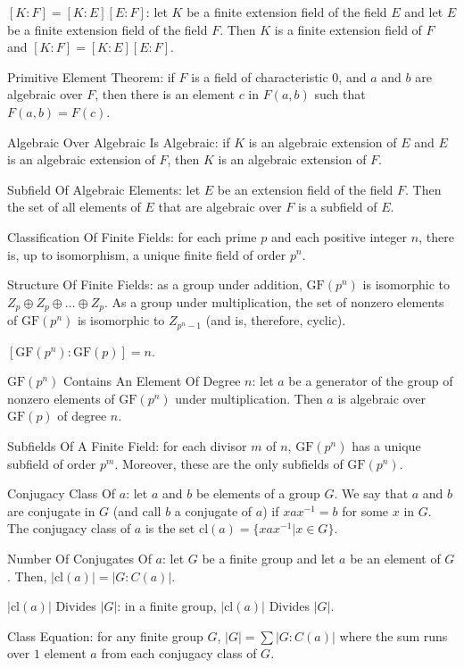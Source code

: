 $[K:F]=[K:E][E:F]$: let $K$ be a finite extension field of the field $E$ and let $E$ be a finite extension field of the field $F$. Then $K$ is a finite extension field of $F$ and $[K:F]=[K:E][E:F]$.

Primitive Element Theorem: if $F$ is a field of characteristic $0$, and $a$ and $b$ are algebraic over $F$, then there is an element $c$ in $F(a,b)$ such that $F(a,b)=F(c)$.

Algebraic Over Algebraic Is Algebraic: if $K$ is an algebraic extension of $E$ and $E$ is an algebraic extension of $F$, then $K$ is an algebraic extension of $F$.

Subfield Of Algebraic Elements: let $E$ be an extension field of the field $F$. Then the set of all elements of $E$ that are algebraic over $F$ is a subfield of $E$.

Classification Of Finite Fields: for each prime $p$ and each positive integer $n$, there is, up to isomorphism, a unique finite field of order $p^n$.

Structure Of Finite Fields: as a group under addition, $\text{GF}(p^n)$ is isomorphic to $Z_p \oplus Z_p \oplus \dots \oplus Z_p$. As a group under multiplication, the set of nonzero elements of $\text{GF}(p^n)$ is isomorphic to $Z_{p^n-1}$ (and is, therefore, cyclic).

$[\text{GF}(p^n):\text{GF}(p)]=n$.

$\text{GF}(p^n)$ Contains An Element Of Degree $n$: let $a$ be a generator of the group of nonzero elements of $\text{GF}(p^n)$ under multiplication. Then $a$ is algebraic over $\text{GF}(p)$ of degree $n$.

Subfields Of A Finite Field: for each divisor $m$ of $n$, $\text{GF}(p^n)$ has a unique subfield of order $p^m$. Moreover, these are the only subfields of $\text{GF}(p^n)$.

Conjugacy Class Of $a$: let $a$ and $b$ be elements of a group $G$. We say that $a$ and $b$ are conjugate in $G$ (and call $b$ a conjugate of $a$) if $xax^{-1} = b$ for some $x$ in $G$. The conjugacy class of $a$ is the set $\text{cl}(a) = \{ xax^{-1} | x \in G \}$.

Number Of Conjugates Of $a$: let $G$ be a finite group and let $a$ be an element of $G$. Then, $|\text{cl}(a)|=|G:C(a)|$.

$| \text{cl}(a) |$ Divides $|G|$: in a finite group, $| \text{cl}(a) |$ Divides $|G|$.

Class Equation: for any finite group $G$, $|G| = \sum |G:C(a)|$ where the sum runs over $1$ element $a$ from each conjugacy class of $G$.

